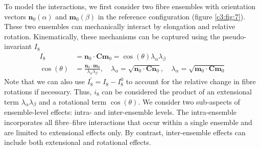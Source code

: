     
    To model the interactions, we first consider two fibre ensembles with orientation vectors $\mathbf{n}_0(\alpha)$ and $\mathbf{m}_0(\beta)$ in the reference configuration (figure \ref{c3:fig:7}). These two ensembles can mechanically interact by elongation and relative rotation. Kinematically, these mechanisms can be captured using the pseudo-invariant $I_8$ \cite{holzapfel_nonlinear_2000,merodio_influence_2006} 
        \begin{equation}\label{c3:eqn:49}
        \begin{aligned}
        I_8 &= \mathbf{n}_0\cdot\mathbf{C}\mathbf{m}_0 = \cos(\theta)\lambda_\alpha\lambda_\beta \\
        \cos(\theta) &= \frac{\mathbf{n}_0\cdot\mathbf{m}_0}{\lambda_\alpha\lambda_\beta}, \quad \lambda_\alpha=\sqrt{\mathbf{n}_0\cdot\mathbf{C}\mathbf{n}_0}, \quad \lambda_\alpha=\sqrt{\mathbf{m}_0\cdot\mathbf{C}\mathbf{m}_0} 
        \end{aligned}
        \end{equation}
    Note that we can also use $I_8^\prime = I_8  - I_8^0$ \cite{merodio_influence_2006} to account for the relative change in fibre rotations if necessary. Thus, $i_8$ can be considered the product of an extensional term $\lambda_\alpha \lambda_\beta$ and a rotational term $\cos(\theta)$. We consider two sub-aspects of ensemble-level effects: intra- and inter-ensemble levels. The intra-ensemble incorporates all fibre–fibre interactions that occur within a single ensemble and are limited to extensional effects only. By contrast, inter-ensemble effects can include both extensional and rotational effects.
    
